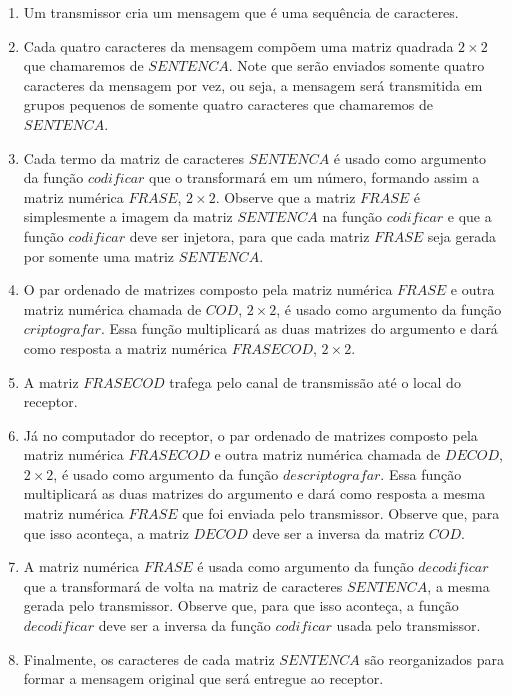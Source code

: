\begin{enumerate}

    \item Um transmissor cria um mensagem que é uma sequência de caracteres.
    \item Cada quatro caracteres da mensagem compõem uma matriz quadrada $2 \times 2$ 
        que chamaremos de $\textit{SENTENCA}$. Note que serão enviados somente 
        quatro caracteres da mensagem por vez, ou seja, a mensagem será 
        transmitida em grupos pequenos de somente quatro caracteres que chamaremos de $\textit{SENTENCA}$.
    \item Cada termo da matriz de caracteres $\textit{SENTENCA}$ é usado como 
        argumento da função $\textit{codificar}$ que o transformará em um número, 
        formando assim a matriz numérica $\textit{FRASE}$, $2 \times 2$. Observe que a matriz 
        $\textit{FRASE}$ é simplesmente a imagem da matriz $\textit{SENTENCA}$ na função $\textit{codificar}$
         e que a função $\textit{codificar}$ deve ser injetora, para que cada matriz $\textit{FRASE}$ 
        seja gerada por somente uma matriz $\textit{SENTENCA}$.
    \item O par ordenado de matrizes composto pela matriz numérica 
        $\textit{FRASE}$ e outra matriz numérica chamada de $\textit{COD}$, $2 \times 2$, é 
        usado como argumento da função $\textit{criptografar}$. Essa função multiplicará 
        as duas matrizes do argumento e dará como resposta a matriz numérica $\textit{FRASECOD}$, $2 \times 2$.
    \item A matriz $\textit{FRASECOD}$ trafega pelo canal de transmissão até o 
        local do receptor.
    \item Já no computador do receptor, o par ordenado de matrizes composto 
        pela matriz numérica $\textit{FRASECOD}$ e outra matriz numérica 
        chamada de $\textit{DECOD}$, $2 \times 2$,  é usado como argumento da função 
        $\textit{descriptografar}$. Essa função multiplicará as duas matrizes do argumento e dará como resposta 
        a mesma matriz numérica $\textit{FRASE}$ que foi enviada pelo transmissor. 
        Observe que, para que isso aconteça, a matriz $\textit{DECOD}$ deve ser 
        a inversa da matriz $\textit{COD}$.
    \item A matriz numérica $\textit{FRASE}$ é usada como argumento da função 
        $\textit{decodificar}$ que a transformará de volta na matriz de caracteres 
        $\textit{SENTENCA}$, a mesma gerada pelo transmissor. 
        Observe que, para que isso aconteça, a função $\textit{decodificar}$ 
        deve ser a inversa da função $\textit{codificar}$ usada pelo transmissor.
    \item Finalmente, os caracteres de cada matriz $\textit{SENTENCA}$ são reorganizados para 
        formar a mensagem original que será entregue ao receptor.

\end{enumerate}

